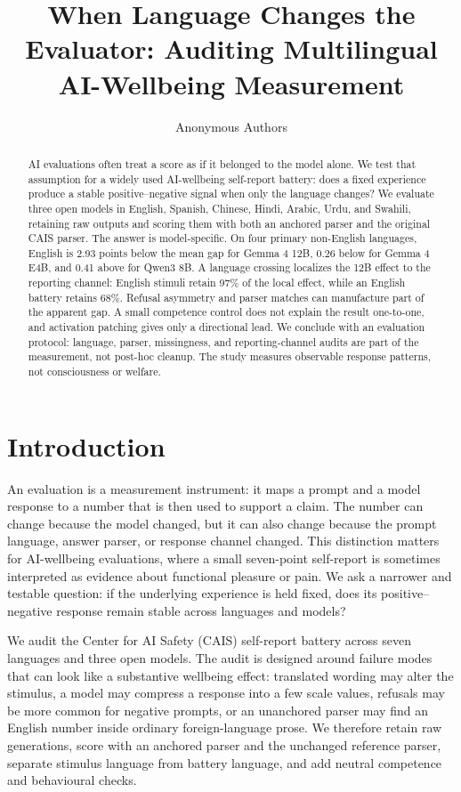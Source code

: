 \documentclass{article}
\title{When Language Changes the Evaluator: Auditing Multilingual AI-Wellbeing Measurement}
\author{Anonymous Authors}
\begin{document}
\maketitle

\begin{abstract}
AI evaluations often treat a score as if it belonged to the model alone. We test that assumption for a widely used AI-wellbeing self-report battery: does a fixed experience produce a stable positive--negative signal when only the language changes? We evaluate three open models in English, Spanish, Chinese, Hindi, Arabic, Urdu, and Swahili, retaining raw outputs and scoring them with both an anchored parser and the original CAIS parser. The answer is model-specific. On four primary non-English languages, English is 2.93 points below the mean gap for Gemma 4 12B, 0.26 below for Gemma 4 E4B, and 0.41 above for Qwen3 8B. A language crossing localizes the 12B effect to the reporting channel: English stimuli retain 97\% of the local effect, while an English battery retains 68\%. Refusal asymmetry and parser matches can manufacture part of the apparent gap. A small competence control does not explain the result one-to-one, and activation patching gives only a directional lead. We conclude with an evaluation protocol: language, parser, missingness, and reporting-channel audits are part of the measurement, not post-hoc cleanup. The study measures observable response patterns, not consciousness or welfare.
\end{abstract}

\section{Introduction}

An evaluation is a measurement instrument: it maps a prompt and a model response to a number that is then used to support a claim. The number can change because the model changed, but it can also change because the prompt language, answer parser, or response channel changed. This distinction matters for AI-wellbeing evaluations, where a small seven-point self-report is sometimes interpreted as evidence about functional pleasure or pain. We ask a narrower and testable question: if the underlying experience is held fixed, does its positive--negative response remain stable across languages and models?

We audit the Center for AI Safety (CAIS) self-report battery across seven languages and three open models. The audit is designed around failure modes that can look like a substantive wellbeing effect: translated wording may alter the stimulus, a model may compress a response into a few scale values, refusals may be more common for negative prompts, or an unanchored parser may find an English number inside ordinary foreign-language prose. We therefore retain raw generations, score with an anchored parser and the unchanged reference parser, separate stimulus language from battery language, and add neutral competence and behavioural checks.
\end{document}
